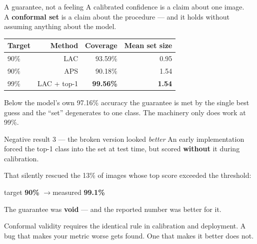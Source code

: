 \documentclass[aspectratio=169,11pt]{beamer}
\begin{document}
\begin{frame}{A guarantee, not a feeling}
\vspace{0.4em}
A calibrated confidence is a claim about one image.\\
A \textbf{conformal set} is a claim about the procedure --- and it holds without assuming
anything about the model.
\vspace{0.9em}
\begin{center}\small
\begin{tabular}{lrrr}
\toprule
Target & Method & Coverage & Mean set size \\
\midrule
90\% & LAC & 93.59\% & 0.95 \\
90\% & APS & 90.18\% & 1.54 \\
99\% & LAC + top-1 & \alert{\textbf{99.56\%}} & \textbf{1.54} \\
\bottomrule
\end{tabular}
\end{center}
\vspace{0.9em}
{\color{dim} Below the model's own 97.16\% accuracy the guarantee is met by the single best
guess and the ``set'' degenerates to one class. The machinery only does work at 99\%.}
\end{frame}

\begin{frame}{Negative result 3 --- the broken version looked \emph{better}}
\vspace{0.6em}
An early implementation forced the top-1 class into the set at test time, but scored
\textbf{without} it during calibration.
\vspace{0.9em}

That silently rescued the 13\% of images whose top score exceeded the threshold:
\vspace{0.5em}
\begin{center}
{\large target \textbf{90\%} \quad$\rightarrow$\quad measured \alert{\textbf{99.1\%}}}
\end{center}
\vspace{0.9em}
The guarantee was \textbf{void} --- and the reported number was better for it.
\vspace{0.8em}

{\color{dim} Conformal validity requires the identical rule in calibration and deployment.
A bug that makes your metric worse gets found. One that makes it better does not.}
\end{frame}
\end{document}
